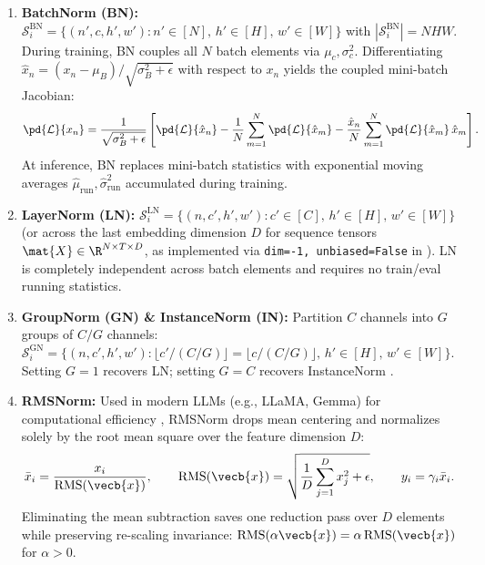\documentclass[../../../../master.tex]{subfiles}
\begin{document}
\begin{coremath}
\label{box:normres:norm_axes}
\begin{enumerate}
  \item \textbf{BatchNorm (BN):} $\mathcal{S}_i^{\text{BN}} = \{(n', c, h', w') : n' \in [N],\, h' \in [H],\, w' \in [W]\}$ with $|\mathcal{S}_i^{\text{BN}}| = NHW$. During training, BN couples all $N$ batch elements via $\mu_c, \sigma_c^2$. Differentiating $\hat{x}_n = (x_n - \mu_B)/\sqrt{\sigma_B^2 + \epsilon}$ with respect to $x_n$ yields the coupled mini-batch Jacobian:
  \begin{equation}
    \pd{\mathcal{L}}{x_n} = \frac{1}{\sqrt{\sigma_B^2 + \epsilon}} \left[ \pd{\mathcal{L}}{\hat{x}_n} - \frac{1}{N}\sum_{m=1}^N \pd{\mathcal{L}}{\hat{x}_m} - \frac{\hat{x}_n}{N}\sum_{m=1}^N \pd{\mathcal{L}}{\hat{x}_m}\,\hat{x}_m \right].
    \label{eq:normres:bn_grad}
  \end{equation}
  At inference, BN replaces mini-batch statistics with exponential moving averages $\hat{\mu}_{\text{run}}, \hat{\sigma}_{\text{run}}^2$ accumulated during training.
  \item \textbf{LayerNorm (LN):} $\mathcal{S}_i^{\text{LN}} = \{(n, c', h', w') : c' \in [C],\, h' \in [H],\, w' \in [W]\}$ (or across the last embedding dimension $D$ for sequence tensors $\mat{X} \in \R^{N \times T \times D}$, as implemented via \texttt{dim=-1, unbiased=False} in ). LN is completely independent across batch elements and requires no train/eval running statistics.
  \item \textbf{GroupNorm (GN) \& InstanceNorm (IN):} Partition $C$ channels into $G$ groups of $C/G$ channels: $\mathcal{S}_i^{\text{GN}} = \{(n, c', h', w') : \lfloor c'/(C/G)\rfloor = \lfloor c/(C/G)\rfloor,\, h' \in [H],\, w' \in [W]\}$. Setting $G=1$ recovers LN; setting $G=C$ recovers InstanceNorm .
  \item \textbf{RMSNorm:} Used in modern LLMs (e.g., LLaMA, Gemma) for computational efficiency , RMSNorm drops mean centering and normalizes solely by the root mean square over the feature dimension $D$:
  \begin{equation}
    \bar{x}_i = \frac{x_i}{\mathrm{RMS}(\vecb{x})}, \qquad
    \mathrm{RMS}(\vecb{x}) = \sqrt{\frac{1}{D}\sum_{j=1}^D x_j^2 + \epsilon}, \qquad
    y_i = \gamma_i \bar{x}_i.
    \label{eq:normres:rmsnorm}
  \end{equation}
  Eliminating the mean subtraction saves one reduction pass over $D$ elements while preserving re-scaling invariance: $\mathrm{RMS}(\alpha\vecb{x}) = \alpha\,\mathrm{RMS}(\vecb{x})$ for $\alpha > 0$.
\end{enumerate}
\end{coremath}
\end{document}
